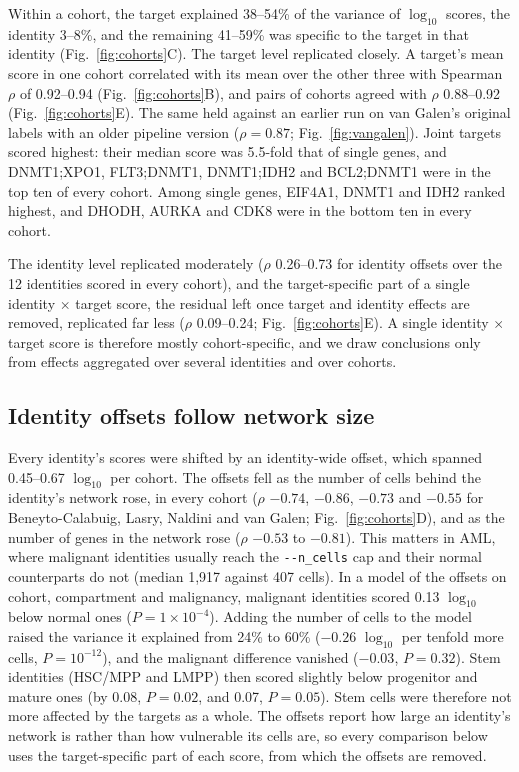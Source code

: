 \documentclass[pdflatex,sn-vancouver-num]{sn-jnl}%
\newcommand{\param}[1]{\texttt{-{}-#1}}
\begin{document}
Within a cohort, the target explained 38--54\% of the variance of $\log_{10}$ scores, the identity 3--8\%, and the remaining 41--59\% was specific to the target in that identity (Fig.~\ref{fig:cohorts}C). The target level replicated closely. A target's mean score in one cohort correlated with its mean over the other three with Spearman $\rho$ of 0.92--0.94 (Fig.~\ref{fig:cohorts}B), and pairs of cohorts agreed with $\rho$ 0.88--0.92 (Fig.~\ref{fig:cohorts}E). The same held against an earlier run on van Galen's original labels with an older pipeline version ($\rho=0.87$; Fig.~\ref{fig:vangalen}). Joint targets scored highest: their median score was 5.5-fold that of single genes, and DNMT1;XPO1, FLT3;DNMT1, DNMT1;IDH2 and BCL2;DNMT1 were in the top ten of every cohort. Among single genes, EIF4A1, DNMT1 and IDH2 ranked highest, and DHODH, AURKA and CDK8 were in the bottom ten in every cohort.

The identity level replicated moderately ($\rho$ 0.26--0.73 for identity offsets over the 12 identities scored in every cohort), and the target-specific part of a single identity $\times$ target score, the residual left once target and identity effects are removed, replicated far less ($\rho$ 0.09--0.24; Fig.~\ref{fig:cohorts}E). A single identity $\times$ target score is therefore mostly cohort-specific, and we draw conclusions only from effects aggregated over several identities and over cohorts.

\subsection{Identity offsets follow network size}

Every identity's scores were shifted by an identity-wide offset, which spanned 0.45--0.67 $\log_{10}$ per cohort. The offsets fell as the number of cells behind the identity's network rose, in every cohort ($\rho$ $-0.74$, $-0.86$, $-0.73$ and $-0.55$ for Beneyto-Calabuig, Lasry, Naldini and van Galen; Fig.~\ref{fig:cohorts}D), and as the number of genes in the network rose ($\rho$ $-0.53$ to $-0.81$). This matters in AML, where malignant identities usually reach the \param{n\_cells} cap and their normal counterparts do not (median 1,917 against 407 cells). In a model of the offsets on cohort, compartment and malignancy, malignant identities scored 0.13 $\log_{10}$ below normal ones ($P=1\times10^{-4}$). Adding the number of cells to the model raised the variance it explained from 24\% to 60\% ($-0.26$ $\log_{10}$ per tenfold more cells, $P=10^{-12}$), and the malignant difference vanished ($-0.03$, $P=0.32$). Stem identities (HSC/MPP and LMPP) then scored slightly below progenitor and mature ones (by 0.08, $P=0.02$, and 0.07, $P=0.05$). Stem cells were therefore not more affected by the targets as a whole. The offsets report how large an identity's network is rather than how vulnerable its cells are, so every comparison below uses the target-specific part of each score, from which the offsets are removed.
\end{document}
